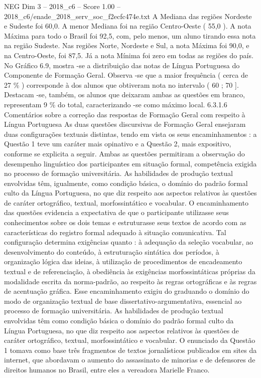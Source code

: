 \begin{textsample}{NEG Dim 3 – 2018\_c6 – Score 1.00 – 2018\_c6/enade\_2018\_serv\_soc\_f2ecfc474e.txt}
A Mediana das regiões Nordeste e Sudeste foi 60,0.
A menor Mediana foi na região Centro-Oeste ( 55,0 ).
A nota Máxima para todo o Brasil foi 92,5, com, pelo menos, um aluno tirando essa nota na região Sudeste.
Nas regiões Norte, Nordeste e Sul, a nota Máxima foi 90,0, e na Centro-Oeste, foi 87,5.
Já a nota Mínima foi zero em todas as regiões do país.
No Gráfico 6.9, mostra -se a distribuição das notas de Língua Portuguesa do Componente de Formação Geral.
Observa -se que a maior frequência ( cerca de 27 \% ) corresponde à dos alunos que obtiveram nota no intervalo ( 60 ; 70 ].
Destacam -se, também, os alunos que deixaram ambas as questões em branco, representam 9 \% do total, caracterizando -se como máximo local. 6.3.1.6 Comentários sobre a correção das respostas de Formação Geral com respeito à Língua Portuguesa As duas questões discursivas de Formação Geral ensejaram duas configurações textuais distintas, tendo em vista os seus encaminhamentos : a Questão 1 teve um caráter mais opinativo e a Questão 2, mais expositivo, conforme se explicita a seguir.
Ambas as questões permitiram a observação do desempenho linguístico dos participantes em situação formal, competência exigida no processo de formação universitária.
As habilidades de produção textual envolvidas têm, igualmente, como condição básica, o domínio do padrão formal culto da Língua Portuguesa, no que diz respeito aos aspectos relativos às questões de caráter ortográfico, textual, morfossintático e vocabular.
O encaminhamento das questões evidencia a expectativa de que o participante utilizasse seus conhecimentos sobre os dois temas e estruturasse seus textos de acordo com as características do registro formal adequado à situação comunicativa.
Tal configuração determina exigências quanto : à adequação da seleção vocabular, ao desenvolvimento do conteúdo, à estruturação sintática dos períodos, à organização lógica das ideias, à utilização de procedimentos de encadeamento textual e de referenciação, à obediência às exigências morfossintáticas próprias da modalidade escrita da norma-padrão, ao respeito às regras ortográficas e às regras de acentuação gráfica.
Esse encaminhamento exigiu do graduando o domínio do modo de organização textual de base dissertativo-argumentativa, essencial ao processo de formação universitária.
As habilidades de produção textual envolvidas têm como condição básica o domínio do padrão formal culto da Língua Portuguesa, no que diz respeito aos aspectos relativos às questões de caráter ortográfico, textual, morfossintático e vocabular.
O enunciado da Questão 1 tomava como base três fragmentos de textos jornalísticos publicados em sites da internet, que abordavam o aumento do assassinato de minorias e de defensores de direitos humanos no Brasil, entre eles a vereadora Marielle Franco.

\end{textsample}
